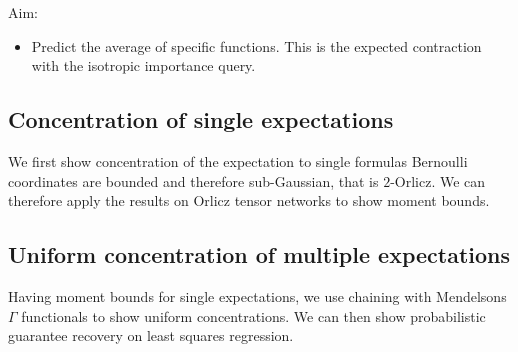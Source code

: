 Aim:
\begin{itemize}
    \item Predict the average of specific functions. This is the expected contraction with the isotropic importance query.
\end{itemize}

\subsection{Concentration of single expectations}

We first show concentration of the expectation to single formulas
Bernoulli coordinates are bounded and therefore sub-Gaussian, that is $2$-Orlicz.
We can therefore apply the results on Orlicz tensor networks to show moment bounds.

\subsection{Uniform concentration of multiple expectations}

Having moment bounds for single expectations, we use chaining with Mendelsons $\Gamma$ functionals to show uniform concentrations.
We can then show probabilistic guarantee recovery on least squares regression.

